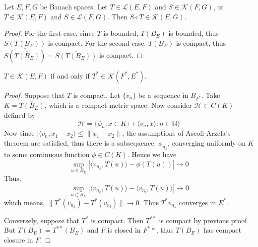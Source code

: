 \begin{prop} Let $E,F,G$ be Banach spaces. Let $T\in \mathcal{L}(E,F)$ and $S\in \mathcal{K}(F,G)$, or $T\in \mathcal{K}(E,F)$ and $S\in \mathcal{L}(F,G)$. Then $S\circ T\in \mathcal{K}(E,G)$.
\end{prop}
\begin{proof}
For the first case, since $T$ is bounded, $T(B_E)$ is bounded, thus $\overline{S(T(B_E))}$ is compact. For the second case, $\overline{T(B_E)}$ is compact, thus $\overline{S(\overline{T(B_E)})}=\overline{S(T(B_E))}$ is compact.
\end{proof}

\begin{thm}[Schauder] $T\in \mathcal{K}(E,F)$ if and only if $T^*\in \mathcal{K}(F^*,E^*)$.
\end{thm}
\begin{proof}
Suppose that $T$ is compact. Let $\{v_n\}$ be a sequence in $B_{F^*}$. Take $K=\overline{T(B_E)}$, which is a compact metric space. Now consider $\mathcal{H}\subset C(K)$ defined by
\begin{equation}
    \mathcal{H}=\{\phi_n:x\in K\mapsto \langle v_n,x\rangle:n\in \mathbb{N}\}
\end{equation}
Now since $|\langle v_n,x_1-x_2\rangle\leq \|x_1-x_2\|$, the assumptions of Ascoli-Arzela's theorem are satisfied, thus there is a subsequence, $\phi_{n_k}$, converging uniformly on $K$ to some continuous function $\phi\in C(K)$. Hence we have
\begin{equation}
    \sup_{u\in B_E}|\langle v_{n_k},T(u)\rangle-\phi(T(u))|\rightarrow 0
\end{equation}
Thus,
\begin{equation}
    \sup_{u\in B_E}|\langle v_{n_k},T(u)\rangle-\langle v_{n_l},T(u)\rangle|\rightarrow 0
\end{equation}
which means, $\|T^*(v_{n_k})-T^*(v_{n_l})\|\rightarrow 0$. Thus $T^* v_{n_k}$ converges in $E^*$.

Conversely, suppose that $T^*$ is compact. Then $T^{**}$ is compact by previous proof. But $T(B_E)=T^{**}(B_E)$ and $F$ is closed in $F^**$, thus $T(B_E)$ has compact closure in $F$.
\end{proof}

